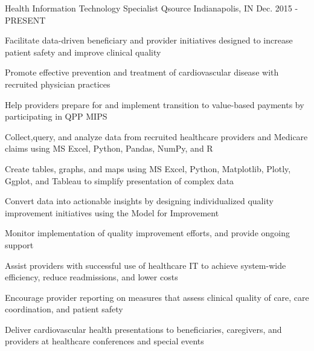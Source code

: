 

\begin{cventries}


  \cventry
    {Health Information Technology Specialist} %
    {Qsource} %
    {Indianapolis, IN} %
    {Dec. 2015 - PRESENT} %
    {
      \begin{cvitems} %
        \item {Facilitate data-driven beneficiary and provider initiatives designed to increase patient safety and improve clinical quality}
        \item {Promote effective prevention and treatment of cardiovascular disease with recruited physician practices}
        \item {Help providers prepare for and implement transition to value-based payments by participating in QPP MIPS}
        \item {Collect,query, and analyze data from recruited healthcare providers and Medicare claims using MS Excel, Python, Pandas, NumPy, and R}
        \item {Create tables, graphs, and maps using MS Excel, Python, Matplotlib, Plotly, Ggplot, and Tableau to simplify presentation of complex data}
        \item {Convert data into actionable insights by designing individualized quality improvement initiatives using the Model for Improvement}
        \item {Monitor implementation of quality improvement efforts, and provide ongoing support}
        \item {Assist providers with successful use of healthcare IT to achieve system-wide efficiency, reduce readmissions, and lower costs}
        \item {Encourage provider reporting on measures that assess clinical quality of care, care coordination, and patient safety}
        \item {Deliver cardiovascular health presentations to beneficiaries, caregivers, and providers at healthcare conferences and special events}
  \end{cvitems}
    }


\end{cventries}
